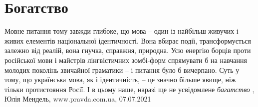  
 
 
 
 
\chapter{Богатство}

Мовне питання тому завжди глибоке, що мова – один із найбільш живучих і живих
елементів національної ідентичності. Вона вбирає події, трансформується залежно
від реалій, вона гнучка, справжня, природна. 
Усю енергію борців проти російської мови і майстрів лінгвістичних зомбі-форм
спрямувати б на навчання молодих поколінь звичайної граматики – і питання було
б вичерпано. Суть у тому, що українська мова, як і ідентичність, – це значно
більше явище, ніж тільки протистояння Росії. І в цьому наше, наразі ще не
усвідомлене \emph{багатство}
, 
Юлія Мендель, www.pravda.com.ua, 07.07.2021
